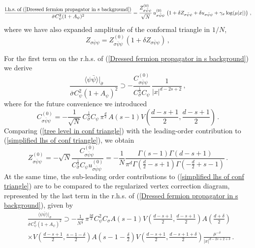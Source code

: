 \documentclass[aps,amsmath,amssymb,prd,showpacs,floatfix,preprint,superscriptaddress,nofootinbib,12pt]{article}
\begin{document}
\begin{align}
\label{simplified lhs of conf triangle}
\frac{\textrm{l.h.s.\;of\;} (\ref{Dressed fermion propagator in s background})}{\bar\sigma C_\psi^2(1+A_\psi)^2}
= \frac{Z_{\sigma\bar\psi\psi}^{(0)}}{\sqrt{N}}\,u_{\sigma\bar\psi\psi}^{(0)}\,
\left(1+\delta Z_{\sigma\bar\psi\psi}+\delta u_{\sigma\bar\psi\psi}+\gamma_\sigma\log(\mu |x|)\right)\,,
\end{align}
where we have also expanded amplitude of the conformal triangle in $1/N$,
\begin{equation}
Z_{\sigma\bar\psi\psi} = Z_{\sigma\bar\psi\psi}^{(0)}(1+\delta Z_{\sigma\bar\psi\psi})\,,
\end{equation}

For the first term on the r.h.s. of (\ref{Dressed fermion propagator in s background}) we derive
\begin{equation}
\label{tree level in conf triangle}
\frac{\langle\psi\bar\psi\rangle|_{\bar\sigma}}{\bar\sigma C_\psi^2(1{+}A_\psi)^2}\supset
-\frac{C_{\sigma\bar\psi\psi}^{(0)}}{C_\sigma^\frac{1}{2} C_\psi}\,
\frac{1}{|x|^{d-2s+2}}\,,
\end{equation}
where for the future convenience we introduced
\begin{equation}
\label{defintion of C sigma psi psi 0}
C_{\sigma\bar\psi\psi}^{(0)} = -\frac{1}{\sqrt{N}}\,C_\sigma^\frac{1}{2} C_\psi \,
\pi^\frac{d}{2}\,A(s-1)V\left(\frac{d-s+1}{2},\frac{d-s+1}{2}\right)\,.
\end{equation}
Comparing (\ref{tree level in conf triangle}) with the leading-order contribution to (\ref{simplified lhs of conf triangle}),
we obtain
\begin{equation}
\label{leading order Z0}
Z_{\sigma\bar\psi\psi}^{(0)}=-\sqrt{N}\frac{C_{\sigma\bar\psi\psi}^{(0)}}{C_\sigma^\frac{1}{2}C_\psi u_{\sigma\bar\psi\psi}^{(0)}}
=-\frac{1}{N}
\frac{\Gamma (s-1) \Gamma (d-s+1)}{\pi ^{d}  \Gamma \left(\frac{d}{2}-s+1\right) \Gamma \left(-\frac{d}{2}+s-1\right)}\,.
\end{equation}
At the same time, the sub-leading order contributions to (\ref{simplified lhs of conf triangle})
are to be compared to the
regularized vertex correction diagram, represented by the last term
in the r.h.s. of (\ref{Dressed fermion propagator in s background}), given by
\begin{align}
&\frac{\langle\psi\bar\psi\rangle|_{\bar\sigma}}{\bar\sigma C_\psi^2(1{+}A_\psi)^2}\supset
-\frac{1}{N^\frac{3}{2}}\,\pi^\frac{3d}{2}C_\psi^2C_\sigma A(s-1)V\left(\frac{d-s+1}{2},\frac{d-s+1}{2}\right)
A\left(\frac{d+\delta}{2}\right)\\
&\times V\left(\frac{d{-}s{+}1}{2},\frac{s{-}1{-}\delta}{2}\right)
A\left(s{-}1{-}\frac{\delta}{2}\right)V\left(\frac{d{-}s{+}1}{2},\frac{d{-}s{+}1{+}\delta}{2}\right)
\frac{\mu^{-\delta}}{|x|^{d{-}2s{+}2{+}\delta}}\,.
\end{align}
\end{document}
